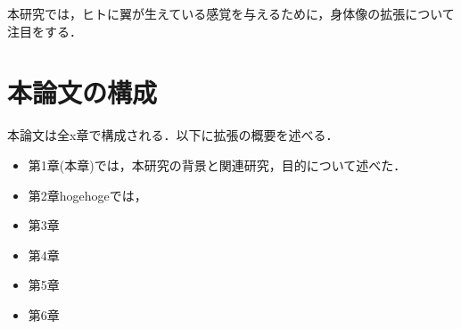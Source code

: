         本研究では，ヒトに翼が生えている感覚を与えるために，身体像の拡張について注目をする．


\section{本論文の構成}

        本論文は全x章で構成される．以下に拡張の概要を述べる．

        \begin{itemize}
                \item 第1章(本章)では，本研究の背景と関連研究，目的について述べた．
                \item  第2章hogehogeでは，
                \item 第3章
                \item 第4章
                \item 第5章
                \item 第6章
        \end{itemize}
        


        
